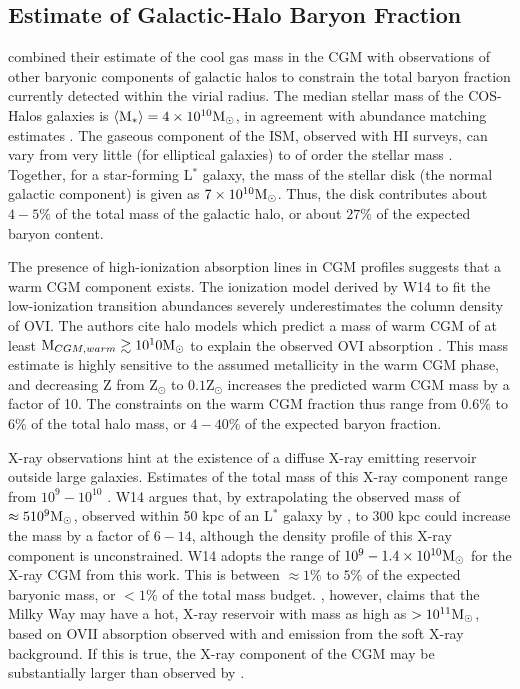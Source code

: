 \subsection{Estimate of Galactic-Halo Baryon Fraction}
\label{sec:Galaxy.Fraction}

\citet{Werk2014} combined their estimate of the cool gas mass in the
CGM with observations of other baryonic components of galactic halos
to constrain the total baryon fraction currently detected within the
virial radius. The median stellar mass of the COS-Halos galaxies is
$\left<\textrm{M}{}_*\right> = 4\times 10^{10}\textrm{M}_\odot$, in agreement with
abundance matching estimates \citep{Behroozi2010}. The gaseous
component of the ISM, observed with HI surveys, can vary from very
little (for elliptical galaxies) to of order the stellar mass
\citep{McGaugh2010, Martin2010}. Together, for a star-forming L$^*$
galaxy, the mass of the stellar disk (the normal galactic component)
is given as $7\times 10^{10}\textrm{M}_\odot{}$. Thus, the disk contributes about $4-5\%$
of the total mass of the galactic halo, or about $27\%$ of the
expected baryon content. 

The presence of high-ionization absorption lines in CGM profiles
suggests that a warm CGM component exists. The ionization model
derived by W14 to fit the low-ionization transition
abundances severely underestimates the column density of OVI. The
authors cite halo models which predict a mass of warm CGM of at least
$\textrm{M}_{CGM, warm} \gtrsim 10^10\textrm{M}_\odot{}$ to explain the observed OVI
absorption \citep{Peeples2014}. This mass estimate is highly sensitive
to the assumed metallicity in the warm CGM phase, and decreasing Z
from Z$_\odot$ to $0.1$Z$_\odot$ increases the predicted warm CGM mass
by a factor of 10. The constraints on the warm CGM fraction thus range
from $0.6\%$ to $6\%$ of the total halo mass, or $4-40\%$ of the
expected baryon fraction. 

X-ray observations hint at the existence of a diffuse X-ray emitting
reservoir outside large galaxies. Estimates of the total mass of this
X-ray component range from $10^9 - 10^{10}$ \Msun{}. W14 argues that,
by extrapolating the observed mass of $\approx 510^9\textrm{M}_\odot{}$, observed
within 50 kpc of an L$^*$ galaxy by \Rosat{} \citep{Anderson2013}, to
300 kpc could increase the mass by a factor of $6-14$, although the
density profile of this X-ray component is unconstrained. W14 adopts
the range of $10^9 - 1.4\times 10^{10}\textrm{M}_\odot{}$ for the X-ray CGM from this
work. This is between $\approx 1\%$ to $5\%$ of the expected baryonic
mass, or $<1\%$ of the total mass budget. \citet{Gupta2012}, however,
claims that the Milky Way may have a hot, X-ray reservoir with mass as
high as $>10^{11}\textrm{M}_\odot{}$, based on OVII absorption observed with
\XMM{} and emission from the soft X-ray background. If this is true,
the X-ray component of the CGM may be substantially larger than
observed by \citet{Anderson2013}. 

